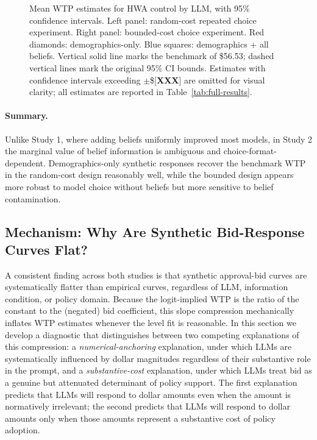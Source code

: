 \documentclass[12pt]{article}
\begin{document}
\begin{figure}[h]
    \centering
    \caption{Mean WTP estimates for HWA control by LLM, with 95\% confidence intervals. Left panel: random-cost repeated choice experiment. Right panel: bounded-cost choice experiment. Red diamonds: demographics-only. Blue squares: demographics + all beliefs. Vertical solid line marks the \textcite{Giguere2020} benchmark of \$56.53; dashed vertical lines mark the original 95\% CI bounds. Estimates with confidence intervals exceeding $\pm$\$[\textbf{XXX}] are omitted for visual clarity; all estimates are reported in Table~\ref{tab:full-results}.}
    \label{fig:hwa-wtp}
\end{figure}

\paragraph{Summary.} Unlike Study 1, where adding beliefs uniformly improved most models, in Study 2 the marginal value of belief information is ambiguous and choice-format-dependent. Demographics-only synthetic responses recover the benchmark WTP in the random-cost design reasonably well, while the bounded design appears more robust to model choice without beliefs but more sensitive to belief contamination.

\subsection{Mechanism: Why Are Synthetic Bid-Response Curves Flat?}\label{sec:results-mechanism}

A consistent finding across both studies is that synthetic approval-bid curves are systematically flatter than empirical curves, regardless of LLM, information condition, or policy domain. Because the logit-implied WTP is the ratio of the constant to the (negated) bid coefficient, this slope compression mechanically inflates WTP estimates whenever the level fit is reasonable. In this section we develop a diagnostic that distinguishes between two competing explanations of this compression: a \textit{numerical-anchoring} explanation, under which LLMs are systematically influenced by dollar magnitudes regardless of their substantive role in the prompt, and a \textit{substantive-cost} explanation, under which LLMs treat bid as a genuine but attenuated determinant of policy support. The first explanation predicts that LLMs will respond to dollar amounts even when the amount is normatively irrelevant; the second predicts that LLMs will respond to dollar amounts only when those amounts represent a substantive cost of policy adoption.
\end{document}
